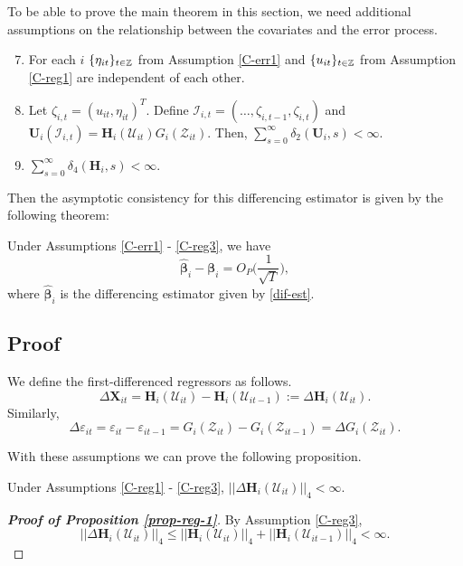 \documentclass[a4paper,12pt]{article}
\begin{document}
To be able to prove the main theorem in this section, we need additional assumptions on the relationship between the covariates and the error process.

\begin{enumerate}[label=(C\arabic*),leftmargin=1.05cm]
\setcounter{enumi}{6}
\item \label{C-reg4} For each $i$ $\{\eta_{it}\}_{t\in\mathbb{Z}}$ from Assumption \ref{C-err1} and $\{u_{it}\}_{t\in\mathbb{Z}}$ from Assumption \ref{C-reg1} are independent of each other.
\item \label{C-reg5} Let $\zeta_{i, t} = (u_{it}, \eta_{it})^T$. Define $\mathcal{I}_{i, t} = (\ldots, \zeta_{i, t-1}, \zeta_{i, t})$ and $\mathbf{U}_i(\mathcal{I}_{i, t}) =  \mathbf{H}_i(\mathcal{U}_{it})G_i(\mathcal{Z}_{it})$. Then, $\sum_{s=0}^\infty \delta_2(\mathbf{U}_i, s)<\infty$.
\item \label{C-reg6} $\sum_{s=0}^\infty \delta_4(\mathbf{H}_i, s)<\infty$.
\end{enumerate}

Then the asymptotic consistency for this differencing estimator is given by the following theorem:

\begin{theorem}\label{thm-reg-1}
Under Assumptions \ref{C-err1} - \ref{C-reg3}, we have
\[\widehat{\bm{\beta}}_i - \bm{\beta}_i = O_P \Big(\frac{1}{\sqrt{T}}\Big),
\]
where $\widehat{\bm{\beta}}_i$ is the differencing estimator given by \eqref{dif-est}.
\end{theorem}



\subsection{Proof}

We define the first-differenced regressors as follows.
\[ \Delta \mathbf{X}_{it} =\mathbf{H}_i(\mathcal{U}_{it}) - \mathbf{H}_i(\mathcal{U}_{it-1}) := \Delta \mathbf{H}_i(\mathcal{U}_{it}). \]
Similarly, 
\[\Delta \varepsilon_{it} = \varepsilon_{it} - \varepsilon_{it-1} = G_i(\mathcal{Z}_{it}) - G_i(\mathcal{Z}_{it-1}) = \Delta G_i(\mathcal{Z}_{it}).
\]
 
With these assumptions we can prove the following proposition.
\begin{prop}\label{prop-reg-1}
Under Assumptions \ref{C-reg1} - \ref{C-reg3}, $|| \Delta \mathbf{H}_i(\mathcal{U}_{it})||_4 < \infty$.
\end{prop}

\begin{proof}[\textnormal{\textbf{Proof of Proposition \ref{prop-reg-1}}}]
By Assumption \ref{C-reg3},
\[
 || \Delta \mathbf{H}_i(\mathcal{U}_{it})||_4 \leq  ||\mathbf{H}_i(\mathcal{U}_{it})||_4 +  || \mathbf{H}_i(\mathcal{U}_{it-1})||_4 < \infty.
\]
\end{proof} 
\end{document}
